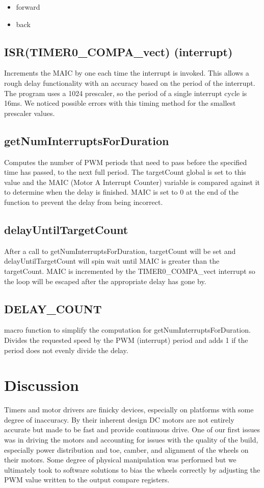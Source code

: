 \documentclass[letterpaper,11pt]{texMemo} %
\begin{document}
\begin{itemize}
    \item forward
    \item back
\end{itemize}

\subsection*{ISR(TIMER0_COMPA_vect) (interrupt)}
Increments the MAIC by one each time the interrupt is invoked. This allows a rough delay functionality with an accuracy based on the period of the interrupt. The program uses a 1024 prescaler, so the period of a single interrupt cycle is 16ms. We noticed possible errors with this timing method for the smallest prescaler values.

\subsection*{getNumInterruptsForDuration}
Computes the number of PWM periods that need to pass before the specified time has passed, to the next full period. The targetCount global is set to this value and the MAIC (Motor A Interrupt Counter) variable is compared against it to determine when the delay is finished. MAIC is set to 0 at the end of the function to prevent the delay from being incorrect.

\subsection*{delayUntilTargetCount}
After a call to getNumInterruptsForDuration, targetCount will be set and delayUntilTargetCount will spin wait until MAIC is greater than the targetCount. MAIC is incremented by the TIMER0_COMPA_vect interrupt so the loop will be escaped after the appropriate delay has gone by.

\subsection*{DELAY_COUNT}
macro function to simplify the computation for getNumInterruptsForDuration. Divides the requested speed by the PWM (interrupt) period and adds 1 if the period does not evenly divide the delay.

\section*{Discussion}
Timers and motor drivers are finicky devices, especially on platforms with 
some degree of inaccuracy. By their inherent design DC motors are not entirely 
accurate but made to be fast and provide continuous drive. One of our first 
issues was in driving the motors and accounting for issues with the quality 
of the build, especially power distribution and toe, camber, and alignment of 
the wheels on their motors. Some degree of physical manipulation was performed 
but we ultimately took to software solutions to bias the wheels correctly by 
adjusting the PWM value written to the output compare registers.
\end{document}
